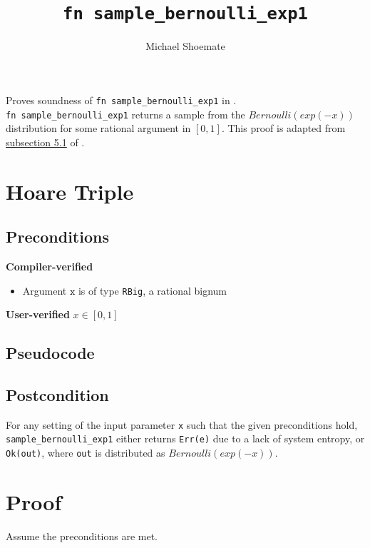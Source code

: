 \documentclass{article}
\title{\texttt{fn sample\_bernoulli\_exp1}}
\author{Michael Shoemate}
\begin{document}
 
\maketitle 
 
Proves soundness of \texttt{fn sample\_bernoulli\_exp1} in .\\ 
\texttt{fn sample\_bernoulli\_exp1} returns a sample from the $Bernoulli(exp(-x))$ distribution for some rational argument in $[0, 1]$. 
This proof is adapted from \href{https://arxiv.org/pdf/2004.00010.pdf#subsection.5.1}{subsection 5.1} of \cite{CKS20}. 
 
\section{Hoare Triple} 
\subsection*{Preconditions} 
 
\textbf{Compiler-verified} 
\begin{itemize} 
    \item Argument $\texttt{x}$ is of type \texttt{RBig}, a rational bignum 
\end{itemize} 
 
\textbf{User-verified} 
$x \in [0, 1]$ 
 
 
\subsection*{Pseudocode}         
 
 
\subsection*{Postcondition} 
\label{postcondition} 
For any setting of the input parameter \texttt{x} such that the given preconditions hold, \\ 
\texttt{sample\_bernoulli\_exp1} either returns \texttt{Err(e)} due to a lack of system entropy, 
or \texttt{Ok(out)}, where \texttt{out} is distributed as $Bernoulli(exp(-x))$. 
 
\section{Proof} 
Assume the preconditions are met. 
 
\end{document}
